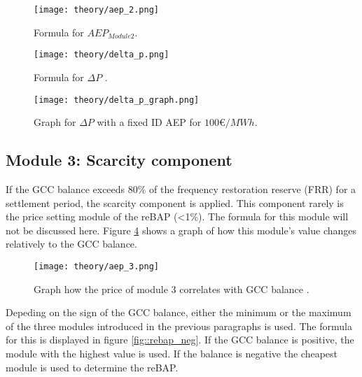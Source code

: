 \documentclass[class=scrbook, crop=false]{standalone}
\begin{document}
 \begin{figure}[ht]
            \centering
            \texttt{[image: theory/aep\_2.png]}
             \caption[Formula for $AEP_{Module 2}$]{Formula for $AEP_{Module 2}$.}
            \label{fig::aep2}
 \end{figure}

 \begin{figure}[ht]
            \centering
            \texttt{[image: theory/delta\_p.png]}
             \caption[Formula for$ \Delta P$]{Formula for $\Delta P$ .}
            \label{fig::delta_p}
 \end{figure}
 
 \begin{figure}[ht]
            \centering
            \texttt{[image: theory/delta\_p\_graph.png]}
             \caption[Graph for $\Delta P$ with a fixed ID AEP for $100€/MWh$]{Graph for $\Delta P$ with a fixed ID AEP for $100€/MWh$.}
            \label{fig::delta_p_graph}
 \end{figure}

\subsection{Module 3: Scarcity component}

If the GCC balance exceeds $80\%$ of the frequency restoration reserve (FRR) for a settlement period, the scarcity component is applied. This component rarely is the price setting module of the reBAP (<1\%). The formula for this module will not be discussed here. Figure \ref{fig::aep_3} shows a graph of how this module's value changes relatively to the GCC balance.


 \begin{figure}[ht]
            \centering
            \texttt{[image: theory/aep\_3.png]}
             \caption[Graph how the price of module 3 correlates with GCC balance]{Graph how the price of module 3 correlates with GCC balance .}
            \label{fig::aep_3}
 \end{figure}


Depeding on the sign of the GCC balance, either the minimum or the maximum of the three modules introduced in the previous paragraphs is used. The formula for this is displayed in figure \ref{fig::rebap_neg}. If the GCC balance is positive, the module with the highest value is used. If the balance is negative the cheapest module is used to determine the reBAP.
\end{document}
